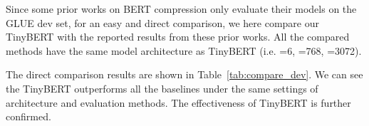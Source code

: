 \documentclass[11pt,a4paper]{article}
\begin{document}
\begin{table*}[ht]
	\begin{center}
		\caption{Comparisons between TinyBERT with other baselines on the dev set of GLUE tasks. Mcc refers to Matthews correlation and Pear/Spea refer to Pearson/Spearman.}
		\label{tab:compare_dev}
	\end{center}
\end{table*}

Since some prior works on BERT compression only evaluate their models on the GLUE dev set, for an easy and direct comparison, we here compare our TinyBERT with the reported results from these prior works. All the compared methods have the same model architecture as TinyBERT (i.e. =6, =768, =3072). 

The direct comparison results are shown in Table~\ref{tab:compare_dev}. We can see the TinyBERT outperforms all the baselines under the same settings of architecture and evaluation methods. The effectiveness of TinyBERT is further confirmed. 
\end{document}
